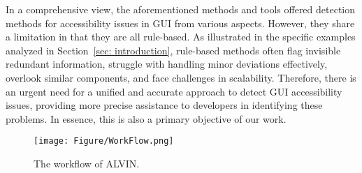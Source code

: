 In a comprehensive view, the aforementioned methods and tools offered detection methods for accessibility issues in GUI from various aspects. 
However, they share a limitation in that they are all rule-based. 
As illustrated in the specific examples analyzed in Section~\ref{sec: introduction}, rule-based methods often flag invisible redundant information, struggle with handling minor deviations effectively, overlook similar components, and face challenges in scalability. 
Therefore, there is an urgent need for a unified and accurate approach to detect GUI accessibility issues, providing more precise assistance to developers in identifying these problems. 
In essence, this is also a primary objective of our work.


\begin{figure*}
\centering
\texttt{[image: Figure/WorkFlow.png]}
\caption{The workflow of ALVIN.}
\label{fig: architecture}
\end{figure*}